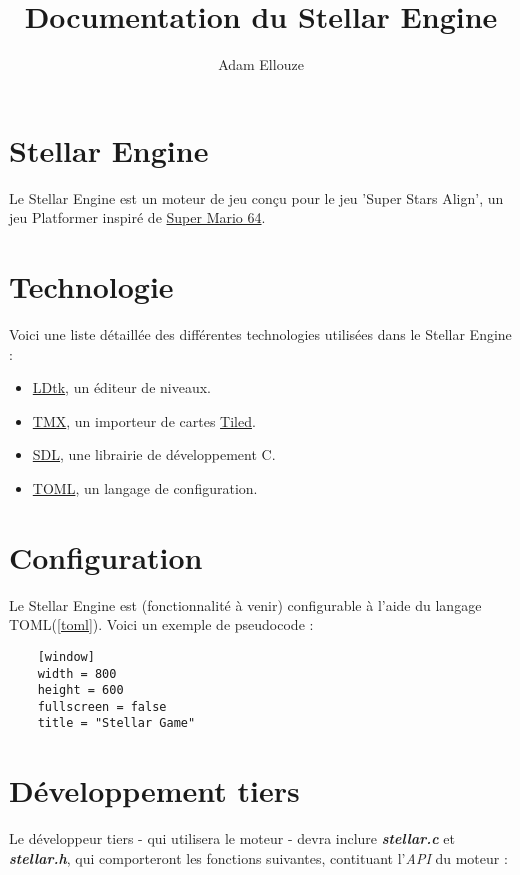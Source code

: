 \documentclass{article}
\title{Documentation du Stellar Engine}
\author{Adam Ellouze}
\numberwithin{equation}{section}    %
\begin{document}

    \maketitle

    \section{Stellar Engine}
    Le Stellar Engine est un moteur de jeu conçu pour le jeu 'Super Stars Align', un jeu Platformer inspiré de \href{https://en.wikipedia.org/wiki/Super_Mario_64}{Super Mario 64}. \vspace{1cm}

    \section{Technologie}
    Voici une liste détaillée des différentes technologies utilisées dans le Stellar Engine :

    \begin{itemize}
        \item \href{https://ldtk.io/}{LDtk}, un éditeur de niveaux.
        \item  \label{maped} \href{https://github.com/baylej/tmx/}{TMX}, un importeur de cartes \href{https://www.mapeditor.org/}{Tiled}.
        \item \href{https://libsdl.com}{SDL}, une librairie de développement C.
        \item \label{toml}  \href{https://toml.io/en/}{TOML}, un langage de configuration.
    \end{itemize}

    \section{Configuration}
    Le Stellar Engine est (fonctionnalité à venir) configurable à l'aide du langage TOML(\ref{toml}). Voici un exemple de pseudocode :


    \begin{lstlisting}
    [window]
    width = 800
    height = 600
    fullscreen = false
    title = "Stellar Game"
    \end{lstlisting}

    \section{Développement tiers}
    Le développeur tiers - qui utilisera le moteur - devra inclure \textit{\textbf{stellar.c}}  et \textit{\textbf{stellar.h}}, qui comporteront les fonctions suivantes, contituant l'\textit{API} du moteur :
\end{document}
